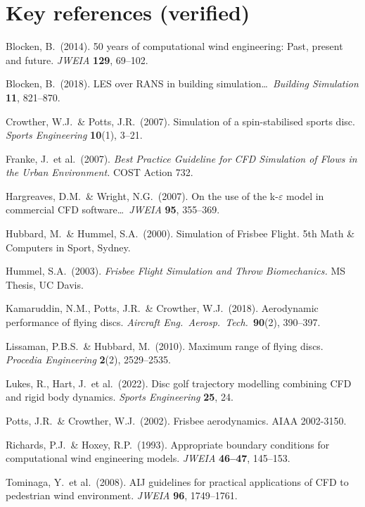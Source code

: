 \documentclass[11pt,letterpaper]{article}
\begin{document}
\section*{Key references (verified)}

\begin{description}[font=\normalfont\itshape,leftmargin=1em]
  \item Blocken, B.\ (2014). 50 years of computational wind engineering: Past, present and future. \emph{JWEIA} \textbf{129}, 69--102.
  \item Blocken, B.\ (2018). LES over RANS in building simulation\ldots\ \emph{Building Simulation} \textbf{11}, 821--870.
  \item Crowther, W.J.\ \& Potts, J.R.\ (2007). Simulation of a spin-stabilised sports disc. \emph{Sports Engineering} \textbf{10}(1), 3--21.
  \item Franke, J.\ et al.\ (2007). \emph{Best Practice Guideline for CFD Simulation of Flows in the Urban Environment.} COST Action 732.
  \item Hargreaves, D.M.\ \& Wright, N.G.\ (2007). On the use of the k-$\varepsilon$ model in commercial CFD software\ldots\ \emph{JWEIA} \textbf{95}, 355--369.
  \item Hubbard, M.\ \& Hummel, S.A.\ (2000). Simulation of Frisbee Flight. 5th Math \& Computers in Sport, Sydney.
  \item Hummel, S.A.\ (2003). \emph{Frisbee Flight Simulation and Throw Biomechanics.} MS Thesis, UC Davis.
  \item Kamaruddin, N.M., Potts, J.R.\ \& Crowther, W.J.\ (2018). Aerodynamic performance of flying discs. \emph{Aircraft Eng.\ Aerosp.\ Tech.}\ \textbf{90}(2), 390--397.
  \item Lissaman, P.B.S.\ \& Hubbard, M.\ (2010). Maximum range of flying discs. \emph{Procedia Engineering} \textbf{2}(2), 2529--2535.
  \item Lukes, R., Hart, J.\ et al.\ (2022). Disc golf trajectory modelling combining CFD and rigid body dynamics. \emph{Sports Engineering} \textbf{25}, 24.
  \item Potts, J.R.\ \& Crowther, W.J.\ (2002). Frisbee\texttrademark{} aerodynamics. AIAA 2002-3150.
  \item Richards, P.J.\ \& Hoxey, R.P.\ (1993). Appropriate boundary conditions for computational wind engineering models. \emph{JWEIA} \textbf{46--47}, 145--153.
  \item Tominaga, Y.\ et al.\ (2008). AIJ guidelines for practical applications of CFD to pedestrian wind environment. \emph{JWEIA} \textbf{96}, 1749--1761.

\end{description}
\end{document}
